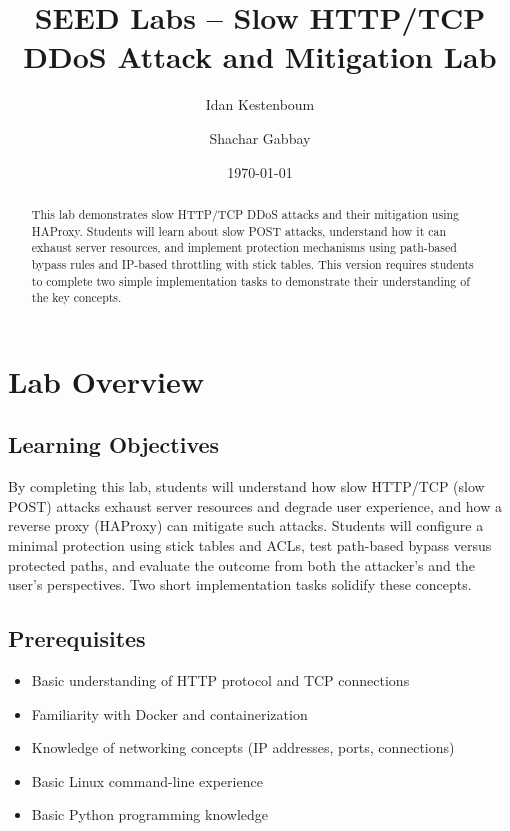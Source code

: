 \documentclass[12pt]{article}
\title{SEED Labs – Slow HTTP/TCP DDoS Attack and Mitigation Lab}
\author{Idan Kestenboum \and Shachar Gabbay}
\date{\today}
\begin{document}
    \maketitle

    \begin{abstract}
    This lab demonstrates slow HTTP/TCP DDoS attacks and their mitigation using HAProxy. Students will learn about slow POST attacks, understand how it can exhaust server resources, and implement protection mechanisms using path-based bypass rules and IP-based throttling with stick tables. This version requires students to complete two simple implementation tasks to demonstrate their understanding of the key concepts.
    \end{abstract}

    \tableofcontents
    \newpage

    \section{Lab Overview}

    \subsection{Learning Objectives}
    By completing this lab, students will understand how slow HTTP/TCP (slow POST) attacks exhaust server resources and degrade user experience, and how a reverse proxy (HAProxy) can mitigate such attacks. Students will configure a minimal protection using stick tables and ACLs, test path-based bypass versus protected paths, and evaluate the outcome from both the attacker's and the user's perspectives. Two short implementation tasks solidify these concepts.

    \subsection{Prerequisites}
    \begin{itemize}
        \item Basic understanding of HTTP protocol and TCP connections
        \item Familiarity with Docker and containerization
        \item Knowledge of networking concepts (IP addresses, ports, connections)
        \item Basic Linux command-line experience
        \item Basic Python programming knowledge
    \end{itemize}
\end{document}
